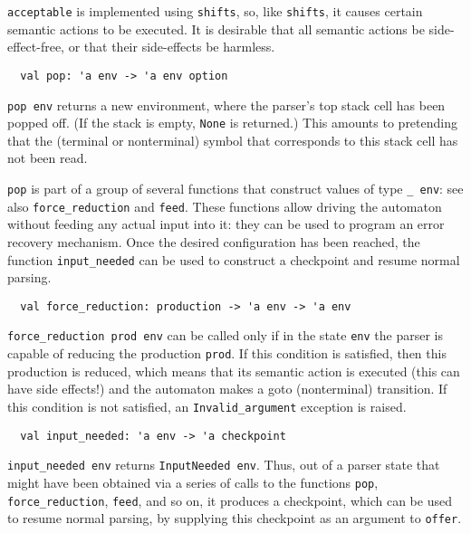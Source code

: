 \documentclass[onecolumn,11pt,nocopyrightspace,preprint]{sigplanconf}
\begin{document}
\verb+acceptable+ is implemented using \verb+shifts+, so, like \verb+shifts+,
it causes certain semantic actions to be executed. It is desirable that all
semantic actions be side-effect-free, or that their side-effects be harmless.


\begin{verbatim}
  val pop: 'a env -> 'a env option
\end{verbatim}

\verb+pop env+ returns a new environment, where the parser's top stack cell
has been popped off. (If the stack is empty, \verb+None+ is returned.) This
amounts to pretending that the (terminal or nonterminal) symbol that
corresponds to this stack cell has not been read.

\verb+pop+ is part of a group of several functions that construct values of
type \verb+_ env+: see also \verb+force_reduction+ and \verb+feed+. These
functions allow driving the automaton without feeding any actual input into
it: they can be used to program an error recovery mechanism. Once the desired
configuration has been reached, the function \verb+input_needed+ can be used
to construct a checkpoint and resume normal parsing.


\begin{verbatim}
  val force_reduction: production -> 'a env -> 'a env
\end{verbatim}

\verb+force_reduction prod env+ can be called only if in the state \verb+env+
the parser is capable of reducing the production \verb+prod+. If this
condition is satisfied, then this production is reduced, which means that its
semantic action is executed (this can have side effects!) and the automaton
makes a goto (nonterminal) transition. If this condition is not satisfied, an
\verb+Invalid_argument+ exception is raised.


\begin{verbatim}
  val input_needed: 'a env -> 'a checkpoint
\end{verbatim}

\verb+input_needed env+ returns \verb+InputNeeded env+. Thus, out of a parser
state that might have been obtained via a series of calls to the functions
\verb+pop+, \verb+force_reduction+, \verb+feed+, and so on, it produces a
checkpoint, which can be used to resume normal parsing, by supplying this
checkpoint as an argument to \verb+offer+.
\end{document}
